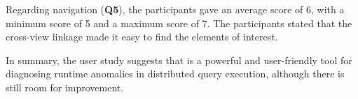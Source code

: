 Regarding navigation (\textbf{Q5}), the participants gave an average score of 6, with a minimum score of 5 and a maximum score of 7. The participants stated that the cross-view linkage made it easy to find the elements of interest. 


In summary, the user study suggests that \qevis{} is a powerful and user-friendly tool for diagnosing runtime anomalies in distributed query execution, although there is still room for improvement.


